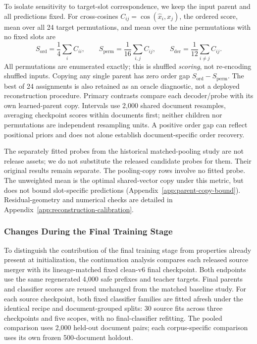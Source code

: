 \documentclass[10pt]{article}
\begin{document}
To isolate sensitivity to target-slot correspondence, we keep the input parent
and all predictions fixed. For cross-cosines
\(C_{ij}=\cos(\hat{x}_i,x_j)\), the ordered score, mean over all 24 target
permutations, and mean over the nine permutations with no fixed slots are
\[
 S_{\mathrm{ord}}=\frac14\sum_i C_{ii},\qquad
 S_{\mathrm{perm}}=\frac1{16}\sum_{i,j}C_{ij},\qquad
 S_{\mathrm{der}}=\frac1{12}\sum_{i\ne j}C_{ij}.
\]
All permutations are enumerated exactly; this is shuffled \emph{scoring}, not
re-encoding shuffled inputs. Copying any single parent has zero order gap
\(S_{\mathrm{ord}}-S_{\mathrm{perm}}\). The best of 24 assignments is also
retained as an oracle diagnostic, not a deployed reconstruction procedure.
Primary contrasts compare each decoder/probe with its own learned-parent copy.
Intervals use 2,000 shared document resamples, averaging checkpoint scores
within documents first; neither children nor permutations are independent
resampling units. A positive order gap can reflect positional priors and does
not alone establish document-specific order recovery.

The separately fitted probes from the historical matched-pooling study are
not release assets; we do not substitute the released candidate probes for them.
Their original results remain separate. The pooling-copy rows involve no
fitted probe. The unweighted mean is the optimal shared-vector copy under this
metric, but does not bound slot-specific predictions
(Appendix~\ref{app:parent-copy-bound}). Residual-geometry and numerical checks
are detailed in Appendix~\ref{app:reconstruction-calibration}.

\subsubsection{Changes During the Final Training Stage}
\label{sec:continuation-protocol}

To distinguish the contribution of the final training stage from properties
already present at initialization, the continuation analysis compares each
released source merger with its lineage-matched fixed clean-v6 final checkpoint.
Both endpoints use the same regenerated 4,000 safe prefixes and teacher targets. Final parents
and classifier scores are reused unchanged from the matched baseline study.
For each source checkpoint, both fixed classifier families are fitted afresh
under the identical recipe and document-grouped splits: 30 source fits across
three checkpoints and five scopes, with no final-classifier refitting.
The pooled comparison uses 2,000 held-out document pairs; each corpus-specific
comparison uses its own frozen 500-document holdout.
\end{document}
